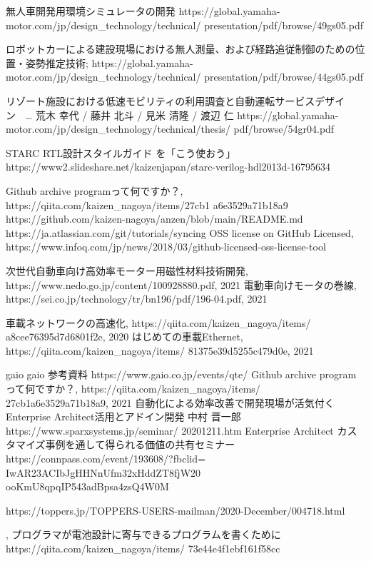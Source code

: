 \documentclass[twocolumn]{article} %
\begin{document}
\begin{thebibliography}{99}
 無人車開発用環境シミュレータの開発
https://global.yamaha-motor.com/jp/design\_technology/technical/
presentation/pdf/browse/49gs05.pdf

ロボットカーによる建設現場における無人測量、および経路追従制御のための位置・姿勢推定技術;
https://global.yamaha-motor.com/jp/design\_technology/technical/
presentation/pdf/browse/44gs05.pdf

リゾート施設における低速モビリティの利用調査と自動運転サービスデザイン　… 荒木 幸代 / 藤井 北斗 / 見米 清隆 / 渡辺 仁
https://global.yamaha-motor.com/jp/design\_technology/technical/thesis/
pdf/browse/54gr04.pdf

 STARC RTL設計スタイルガイド を「こう使おう」
https://www2.slideshare.net/kaizenjapan/starc-verilog-hdl2013d-16795634

 Github archive programって何ですか？, https://qiita.com/kaizen\_nagoya/items/27cb1 a6e3529a71b18a9
 https://github.com/kaizen-nagoya/anzen/blob/main/README.md
 https://ja.atlassian.com/git/tutorials/syncing
 OSS license on GitHub Licensed, https://www.infoq.com/jp/news/2018/03/github-licensed-oss-license-tool


 次世代自動車向け高効率モーター用磁性材料技術開発, https://www.nedo.go.jp/content/100928880.pdf, 2021
電動車向けモータの巻線, https://sei.co.jp/technology/tr/bn196/pdf/196-04.pdf, 2021

車載ネットワークの高速化, https://qiita.com/kaizen\_nagoya/items/
a8cee76395d7d6801f2e, 2020
はじめての車載Ethernet, https://qiita.com/kaizen\_nagoya/items/
81375e39d5255c479d0e, 2021

\bibitem{}gaio gaio 参考資料
https://www.gaio.co.jp/events/qte/
 Github archive programって何ですか？, https://qiita.com/kaizen\_nagoya/items/
27cb1a6e3529a71b18a9, 2021
自動化による効率改善で開発現場が活気付くEnterprise Architect活用とアドイン開発 中村 晋一郎 
https://www.sparxsystems.jp/seminar/
20201211.htm
 Enterprise Architect カスタマイズ事例を通して得られる価値の共有セミナー
https://connpass.com/event/193608/?fbclid=
IwAR23ACIbJgHHNnUfm32xHddZT8fjW20
ooKmU8qpqIP543adBpsa4zsQ4W0M


https://toppers.jp/TOPPERS-USERS-mailman/2020-December/004718.html


, 
プログラマが電池設計に寄与できるプログラムを書くために
https://qiita.com/kaizen\_nagoya/items/
73e44e4f1ebf161f58cc


\end{thebibliography}
\end{document}
